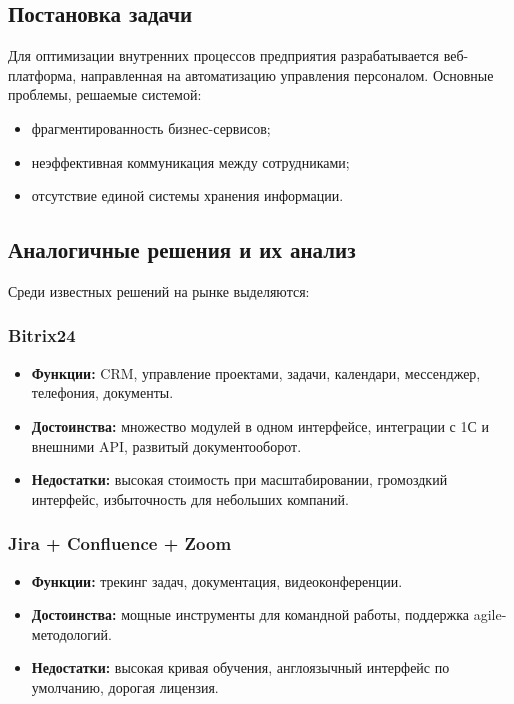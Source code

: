 \subsection{Постановка задачи}

Для оптимизации внутренних процессов предприятия разрабатывается веб-платформа, направленная на автоматизацию управления персоналом. Основные проблемы, решаемые системой:
\begin{itemize}
  \item фрагментированность бизнес-сервисов;
  \item неэффективная коммуникация между сотрудниками;
  \item отсутствие единой системы хранения информации.
\end{itemize}

\subsection{Аналогичные решения и их анализ}

Среди известных решений на рынке выделяются:

\subsubsection{Bitrix24}
\begin{itemize}
  \item \textbf{Функции:} CRM, управление проектами, задачи, календари, мессенджер, телефония, документы.
  \item \textbf{Достоинства:} множество модулей в одном интерфейсе, интеграции с 1С и внешними API, развитый документооборот.
  \item \textbf{Недостатки:} высокая стоимость при масштабировании, громоздкий интерфейс, избыточность для небольших компаний.
\end{itemize}

\subsubsection{Jira + Confluence + Zoom}
\begin{itemize}
  \item \textbf{Функции:} трекинг задач, документация, видеоконференции.
  \item \textbf{Достоинства:} мощные инструменты для командной работы, поддержка agile-методологий.
  \item \textbf{Недостатки:} высокая кривая обучения, англоязычный интерфейс по умолчанию, дорогая лицензия.
\end{itemize}

